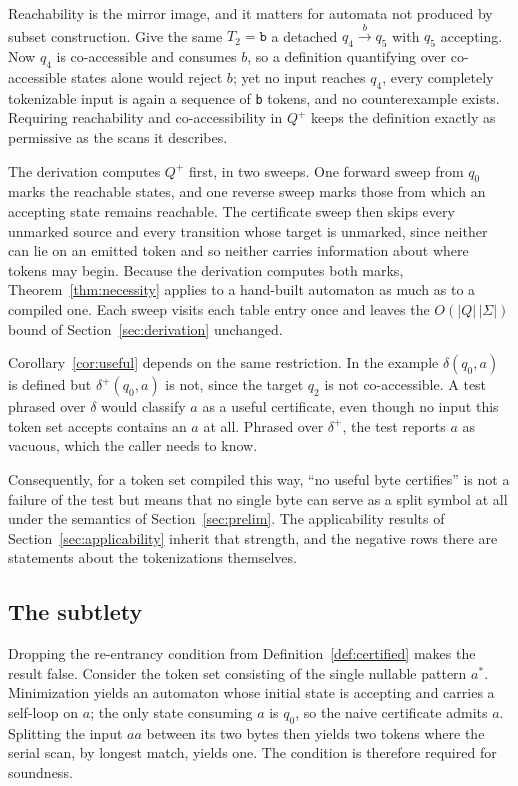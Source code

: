 \documentclass[11pt,a4paper]{article}
\theoremstyle{definition}
\theoremstyle{plain}
\newcommand{\code}[1]{\texttt{#1}}
\begin{document}
Reachability is the mirror image, and it matters for automata not produced by subset construction. Give the same
$T_2 = \code{b}$ a detached $q_4 \xrightarrow{b} q_5$ with $q_5$ accepting. Now $q_4$ is co-accessible and consumes $b$,
so a definition quantifying over co-accessible states alone would reject $b$; yet no input reaches $q_4$, every
completely tokenizable input is again a sequence of \code{b} tokens, and no counterexample exists. Requiring
reachability and co-accessibility in $Q^+$ keeps the definition exactly as permissive as the scans it describes.

The derivation computes $Q^+$ first, in two sweeps. One forward sweep from $q_0$ marks the reachable states, and one
reverse sweep marks those from which an accepting state remains reachable. The certificate sweep then skips every
unmarked source and every transition whose target is unmarked, since neither can lie on an emitted token and so neither
carries information about where tokens may begin. Because the derivation computes both marks,
Theorem~\ref{thm:necessity} applies to a hand-built automaton as much as to a compiled one. Each sweep visits each table
entry once and leaves the $O(|Q|\,|\Sigma|)$ bound of Section~\ref{sec:derivation} unchanged.

Corollary~\ref{cor:useful} depends on the same restriction. In the example $\delta(q_0, a)$ is defined but
$\delta^+(q_0, a)$ is not, since the target $q_2$ is not co-accessible. A test phrased over $\delta$ would classify $a$
as a useful certificate, even though no input this token set accepts contains an $a$ at all. Phrased over $\delta^+$,
the test reports $a$ as vacuous, which the caller needs to know.

Consequently, for a token set compiled this way, ``no useful byte certifies'' is not a failure of the test but means
that no single byte can serve as a split symbol at all under the semantics of Section~\ref{sec:prelim}. The
applicability results of Section~\ref{sec:applicability} inherit that strength, and the negative rows there are
statements about the tokenizations themselves.

\subsection{The subtlety}
\label{sec:subtlety}

Dropping the re-entrancy condition from Definition~\ref{def:certified} makes the result false. Consider the token set
consisting of the single nullable pattern $a^*$. Minimization yields an automaton whose initial state is accepting and
carries a self-loop on $a$; the only state consuming $a$ is $q_0$, so the naive certificate admits $a$. Splitting the
input $aa$ between its two bytes then yields two tokens where the serial scan, by longest match, yields one. The
condition is therefore required for soundness.
\end{document}
